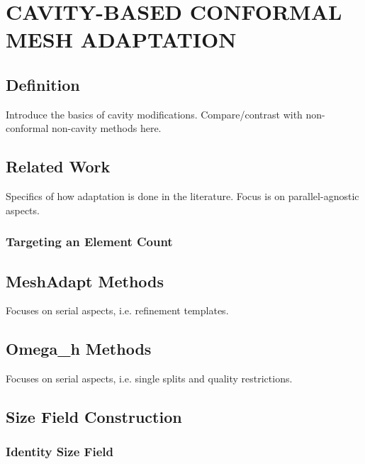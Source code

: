 
\chapter{CAVITY-BASED CONFORMAL MESH ADAPTATION}
\label{chap:adapt}

\section{Definition}

Introduce the basics of cavity modifications.
Compare/contrast with non-conformal non-cavity methods here.

\section{Related Work}

Specifics of how adaptation is done in the literature.
Focus is on parallel-agnostic aspects.

\subsection{Targeting an Element Count}

\section{MeshAdapt Methods}
\label{sec:ma_methods}

Focuses on serial aspects, i.e. refinement templates.

\section{Omega\_h Methods}
\label{sec:omega_h-adapt}

Focuses on serial aspects, i.e. single splits and
quality restrictions.

\section{Size Field Construction}

\subsection{Identity Size Field}

